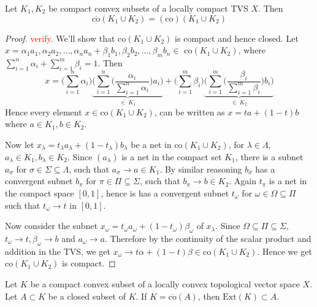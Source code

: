 
\begin{lemma}
  Let $K_1, K_2$ be compact convex subsets of a locally compact TVS $X$. Then \[
    \overline{\textrm{co}}(K_1 \cup K_2) = (\textrm{co})( K_1 \cup K_2)
  \]
  \label{lem:convex_hull_of_the union_of_compact_convex_sets_are_compact}
\end{lemma}
\begin{proof}
  \textcolor{red}{verify}.
  We'll show that $\textrm{co}(K_1 \cup K_2)$ is compact and hence
  closed. Let $x = \alpha_1a_1 , \alpha_2a_2 , \ldots , \alpha_na_n +
  \beta_1b_1 , \beta_2b_2 , \ldots , \beta_mb_n \in \textrm{ co}(K_1
  \cup K_2)$, where $\sum_{i = 1}^{n} \alpha_i + \sum_{i = 1}^{m}
  \beta_i = 1$. Then \[
    x = \big(\sum_{i = 1}^{n} \alpha_i\big) \underbrace{\Bigg(
        \sum_{i = 1}^{n} \Big( \frac{\alpha_i}{\sum_{i = 1}^{n}
    \alpha_i}\Big) a_i\Bigg)}_{\in \ K_1}+ \big(\sum_{i = 1}^{m}
    \beta_i \big) \underbrace{\Bigg( \sum_{i = 1}^{m} \Big(
    \frac{\beta_i}{\sum_{i = 1}^{m} \beta_i}\Big) b_i\Bigg)}_{\in \ K_2}
  \]
  Hence every element $x \in \textrm{co}(K_1 \cup K_2)$, can be
  written as $x = ta + (1-t)b$ where $ a \in K_1, b \in K_2$.

  Now let $x_\lambda = t_\lambda a_\lambda + (1-t_\lambda)b_\lambda$
  be a net in $\textrm{co}(K_1 \cup K_2)$, for $  \lambda \in
  \Lambda$, $a_\lambda \in K_1, b_\lambda \in K_2$. Since
  $(a_\lambda)$ is a net in the compact set $K_1$, there is a subnet
  $a_\sigma$ for $\sigma \in \Sigma \subseteq \Lambda$, such that
  $a_\sigma \to a \in K_1$. By similar reasoning $b_\sigma$ has a
  convergent subnet $b_\pi$ for $\pi \in \Pi \subseteq \Sigma$, such
  that $b_\pi \to b \in K_2$. Again $t_\pi$ is a net in the compact
  space $[0, 1]$, hence is has a convergent subnet $t_\omega$ for $
  \omega \in \Omega \subseteq \Pi$ such that $t_\omega \to t$ in $[0, 1]$.

  Now consider the subnet $x_\omega = t_\omega a_\omega +
  (1-t_\omega)\beta_\omega$ of $x_\lambda$. Since $ \Omega \subseteq
  \Pi \subseteq \Sigma$, $t_\omega \to t, \beta_\omega \to b$ and
  $a_\omega \to a$. Therefore by the continuity of the scalar product
  and addition in the TVS, we get $x_\omega \to t \alpha + (1-t)
  \beta \in \textrm{co}(K_1 \cup K_2)$. Hence we get $\textrm{co}(K_1
  \cup K_2)$ is compact.
\end{proof}

\begin{theorem}
  Let $K$ be a compact convex subset of a locally convex topological
  vector space $X$. Let $A \subset K$ be a closed subset of $K$. If
  $K = \overline{\textrm{co}}(A)$, then $\textrm{Ext}(K) \subset A$.
\end{theorem}

